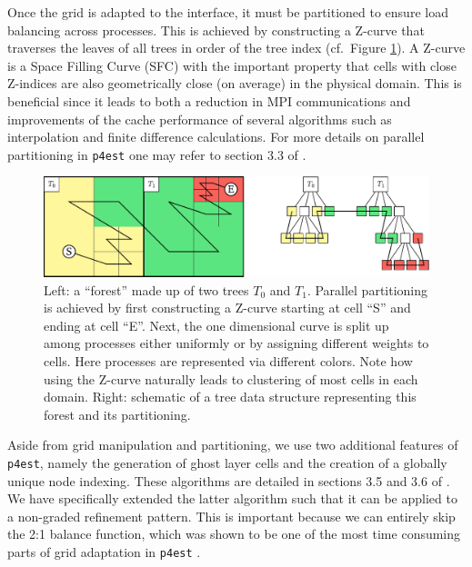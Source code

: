 Once the grid is adapted to the interface, it must be partitioned to ensure
load balancing across processes.
This is achieved by constructing a Z-curve that traverses the leaves of all
trees in order of the tree index (cf.\ Figure \ref{fig:p4est_zcurve}).
A Z-curve is a Space Filling Curve (SFC) with the important property that cells
with close Z-indices are also geometrically close (on average) in the physical
domain.
This is beneficial since it leads to both a reduction in MPI communications and
improvements of the cache performance of several algorithms such as
interpolation and finite difference calculations.
For more details on parallel partitioning in \texttt{p4est} one may refer to
section 3.3 of \cite{Burstedde;Wilcox;Ghattas:11:p4est:-Scalable-Algo}.
\begin{figure}[hbtp]
\begin{center}
\includegraphics[width = \columnwidth]{figures/p4est_zcurve.pdf}
\caption{Left: a ``forest'' made up of two trees $T_0$ and $T_1$. Parallel
partitioning is achieved by first constructing a Z-curve starting at cell ``S''
and ending at cell ``E''.  Next, the one dimensional curve is split up among
processes either uniformly or by assigning different weights to cells.  Here
processes are represented via different colors.  Note how using the Z-curve
naturally leads to clustering of most cells in each domain.  Right: schematic of
a tree data structure representing this forest and its partitioning.}
\label{fig:p4est_zcurve}
\end{center}
\end{figure}
Aside from grid manipulation and partitioning, we use two additional features
of \texttt{p4est}, namely the generation of ghost layer cells and the creation
of a globally unique node indexing.
These algorithms are detailed in sections 3.5 and 3.6 of
\cite{Burstedde;Wilcox;Ghattas:11:p4est:-Scalable-Algo}.
We have specifically extended the latter algorithm such that it can be applied
to a non-graded refinement pattern.
This is important because we can entirely skip the 2:1 balance function, which
was shown to be one of the most time consuming parts of grid adaptation
in \texttt{p4est}
\cite{Burstedde;Wilcox;Ghattas:11:p4est:-Scalable-Algo}.

